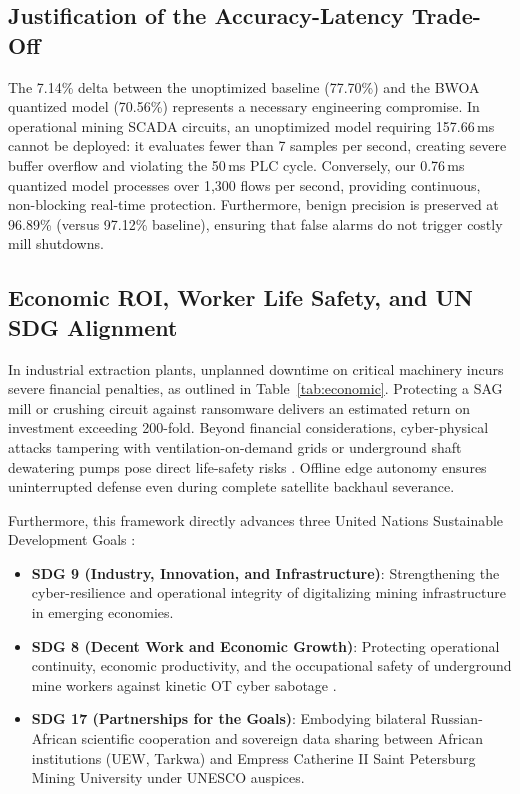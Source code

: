 \documentclass[conference]{IEEEtran}
\begin{document}
\subsection{Justification of the Accuracy-Latency Trade-Off}
The 7.14\% delta between the unoptimized baseline (77.70\%) and the BWOA quantized model (70.56\%) represents a necessary engineering compromise. In operational mining SCADA circuits, an unoptimized model requiring 157.66\,ms cannot be deployed: it evaluates fewer than 7 samples per second, creating severe buffer overflow and violating the 50\,ms PLC cycle. Conversely, our 0.76\,ms quantized model processes over 1,300 flows per second, providing continuous, non-blocking real-time protection. Furthermore, benign precision is preserved at 96.89\% (versus 97.12\% baseline), ensuring that false alarms do not trigger costly mill shutdowns.

\subsection{Economic ROI, Worker Life Safety, and UN SDG Alignment}
In industrial extraction plants, unplanned downtime on critical machinery incurs severe financial penalties, as outlined in Table~\ref{tab:economic}. Protecting a SAG mill or crushing circuit against ransomware delivers an estimated return on investment exceeding 200-fold. Beyond financial considerations, cyber-physical attacks tampering with ventilation-on-demand grids or underground shaft dewatering pumps pose direct life-safety risks \cite{africanminingmarket2024cybersecurity}. Offline edge autonomy ensures uninterrupted defense even during complete satellite backhaul severance.

Furthermore, this framework directly advances three United Nations Sustainable Development Goals \cite{un2015transforming}:
\begin{itemize}
    \item \textbf{SDG 9 (Industry, Innovation, and Infrastructure)}: Strengthening the cyber-resilience and operational integrity of digitalizing mining infrastructure in emerging economies.
    \item \textbf{SDG 8 (Decent Work and Economic Growth)}: Protecting operational continuity, economic productivity, and the occupational safety of underground mine workers against kinetic OT cyber sabotage \cite{africanminingmarket2024cybersecurity, itonline2026digital}.
    \item \textbf{SDG 17 (Partnerships for the Goals)}: Embodying bilateral Russian-African scientific cooperation and sovereign data sharing between African institutions (UEW, Tarkwa) and Empress Catherine II Saint Petersburg Mining University under UNESCO auspices.
\end{itemize}
\end{document}
